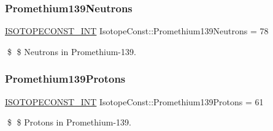 \subsubsection{\texorpdfstring{Promethium139\+Neutrons}{Promethium139Neutrons}}
{\footnotesize\ttfamily \mbox{\hyperlink{group___isotope_const-_macros_ga5f18360b3e99483a35c32d789e62621c}{I\+S\+O\+T\+O\+P\+E\+C\+O\+N\+S\+T\+\_\+\+I\+NT}} Isotope\+Const\+::\+Promethium139\+Neutrons = 78}

\$ \$ Neutrons in Promethium-\/139. \mbox{\label{group___isotope_const-_promethium-_pm139_ga45a8746a3d64e45d05535f1e9b475797}} 
\subsubsection{\texorpdfstring{Promethium139\+Protons}{Promethium139Protons}}
{\footnotesize\ttfamily \mbox{\hyperlink{group___isotope_const-_macros_ga5f18360b3e99483a35c32d789e62621c}{I\+S\+O\+T\+O\+P\+E\+C\+O\+N\+S\+T\+\_\+\+I\+NT}} Isotope\+Const\+::\+Promethium139\+Protons = 61}

\$ \$ Protons in Promethium-\/139. 